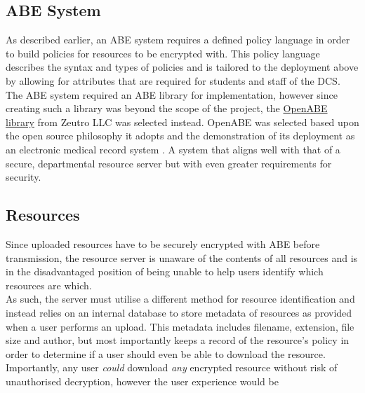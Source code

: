\subsection{ABE System}
\label{subsec:design_abe_sys}

As described earlier, an ABE system requires a defined policy language in order to build policies for resources to be encrypted with. This policy language describes the syntax and types of policies and is tailored to the deployment above by allowing for attributes that are required for students and staff of the DCS.\\
The ABE system required an ABE library for implementation, however since creating such a library was beyond the scope of the project, the \href{https://github.com/zeutro/openabe}{OpenABE library} from Zeutro LLC was selected instead. OpenABE was selected based upon the open source philosophy it adopts and the demonstration of its deployment as an electronic medical record system \cite{Akinyele2011}. A system that aligns well with that of a secure, departmental resource server but with even greater requirements for security.

\subsection{Resources}
\label{subsec:design_resources}

Since uploaded resources have to be securely encrypted with ABE before transmission, the resource server is unaware of the contents of all resources and is in the disadvantaged position of being unable to help users identify which resources are which.\\
As such, the server must utilise a different method for resource identification and instead relies on an internal database to store metadata of resources as provided when a user performs an upload. This metadata includes filename, extension, file size and author, but most importantly keeps a record of the resource's policy in order to determine if a user should even be able to download the resource.\\
Importantly, any user \textit{could} download \textit{any} encrypted resource without risk of unauthorised decryption, however the user experience would be
